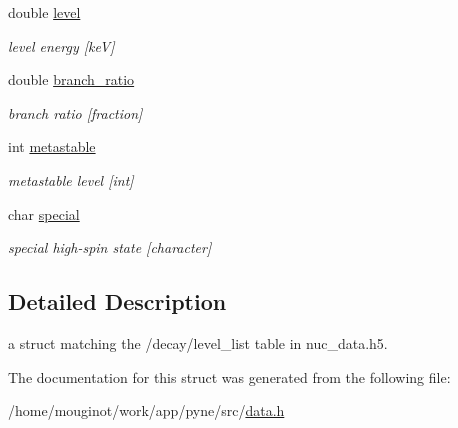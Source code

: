 \begin{DoxyCompactItemize}
double \hyperlink{structpyne_1_1level__data_af029059b5f79cfa2ad22e6f9fcb04ac9}{level}
\begin{DoxyCompactList}\small\item\em level energy \mbox{[}keV\mbox{]} \end{DoxyCompactList}\item 
\mbox{\label{structpyne_1_1level__data_a5ce97c540e0ce558156e5a43510a4633}} 
double \hyperlink{structpyne_1_1level__data_a5ce97c540e0ce558156e5a43510a4633}{branch\+\_\+ratio}
\begin{DoxyCompactList}\small\item\em branch ratio \mbox{[}fraction\mbox{]} \end{DoxyCompactList}\item 
\mbox{\label{structpyne_1_1level__data_a7a71068eed39597f007cc6624727e954}} 
int \hyperlink{structpyne_1_1level__data_a7a71068eed39597f007cc6624727e954}{metastable}
\begin{DoxyCompactList}\small\item\em metastable level \mbox{[}int\mbox{]} \end{DoxyCompactList}\item 
\mbox{\label{structpyne_1_1level__data_acabc31aa71741dbc2ea5485ca51da0d6}} 
char \hyperlink{structpyne_1_1level__data_acabc31aa71741dbc2ea5485ca51da0d6}{special}
\begin{DoxyCompactList}\small\item\em special high-\/spin state \mbox{[}character\mbox{]} \end{DoxyCompactList}\end{DoxyCompactItemize}


\subsection{Detailed Description}
a struct matching the \textquotesingle{}/decay/level\+\_\+list\textquotesingle{} table in nuc\+\_\+data.\+h5. 

The documentation for this struct was generated from the following file\+:\begin{DoxyCompactItemize}
\item 
/home/mouginot/work/app/pyne/src/\hyperlink{data_8h}{data.\+h}\end{DoxyCompactItemize}

